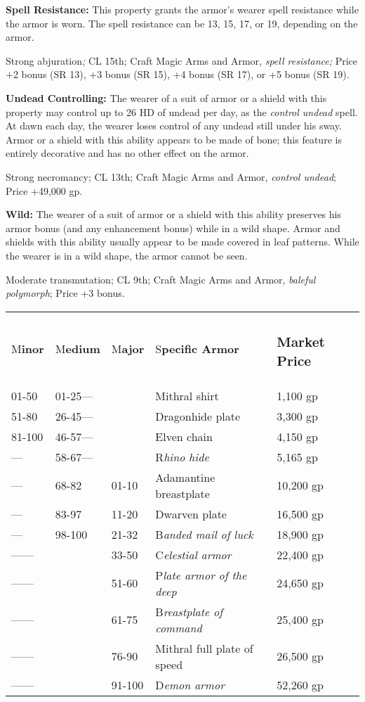 \documentclass{article}
\begin{document}
\textbf{Spell Resistance: }This property grants the armor's wearer spell resistance 
while the armor is worn. The spell resistance can be 13, 15, 17, or 19, depending 
on the armor.

Strong abjuration\textit{; }CL 15th; Craft Magic Arms and Armor, \textit{spell 
resistance; }Price +2 bonus (SR 13), +3 bonus (SR 15), +4 bonus (SR 17), or +5 
bonus (SR 19).

\textbf{Undead Controlling:} The wearer of a suit of armor or a shield with this 
property may control up to 26 HD of undead per day, as the \textit{control undead 
}spell. At dawn each day, the wearer loses control of any undead still under his 
sway. Armor or a shield with this ability appears to be made of bone; this feature 
is entirely decorative and has no other effect on the armor.

Strong necromancy; CL 13th; Craft Magic Arms and Armor, \textit{control undead}; 
Price +49,000 gp.

\textbf{Wild:} The wearer of a suit of armor or a shield with this ability preserves 
his armor bonus (and any enhancement bonus) while in a wild shape. Armor and shields 
with this ability usually appear to be made covered in leaf patterns. While the 
wearer is in a wild shape, the armor cannot be seen.

Moderate transmutation; CL 9th; Craft Magic Arms and Armor, \textit{baleful polymorph}; 
Price +3 bonus.

\vspace{12pt}
\begin{tabular}{|>{\raggedright}p{28pt}|>{\raggedright}p{34pt}|>{\raggedright}p{28pt}|>{\raggedright}p{103pt}|>{\raggedright}p{55pt}|}
\hline
\multicolumn{5}{|p{251pt}|}{T\textbf{able: Specific Armors}}\tabularnewline
\hline
M\textbf{inor} & M\textbf{edium} & M\textbf{ajor} & S\textbf{pecific Armor} & \subsubsection*{M\textbf{arket 
Price}}\tabularnewline
\hline
01-50 & 01-25--- &  & Mithral shirt & 1,100 gp\tabularnewline
\hline
51-80 & 26-45--- &  & Dragonhide plate & 3,300 gp\tabularnewline
\hline
81-100 & 46-57--- &  & Elven chain & 4,150 gp\tabularnewline
\hline
--- & 58-67--- &  & R\textit{hino hide} & 5,165 gp\tabularnewline
\hline
--- & 68-82 & 01-10 & Adamantine breastplate & 10,200 gp\tabularnewline
\hline
--- & 83-97 & 11-20 & Dwarven plate & 16,500 gp\tabularnewline
\hline
--- & 98-100 & 21-32 & B\textit{anded mail of luck} & 18,900 gp\tabularnewline
\hline
------ &  & 33-50 & C\textit{elestial armor} & 22,400 gp\tabularnewline
\hline
------ &  & 51-60 & P\textit{late armor of the deep} & 24,650 gp\tabularnewline
\hline
------ &  & 61-75 & B\textit{reastplate of command} & 25,400 gp\tabularnewline
\hline
------ &  & 76-90 & Mithral full plate of speed & 26,500 gp\tabularnewline
\hline
------ &  & 91-100 & D\textit{emon armor} & 52,260 gp\tabularnewline
\hline
\end{tabular}
\end{document}
